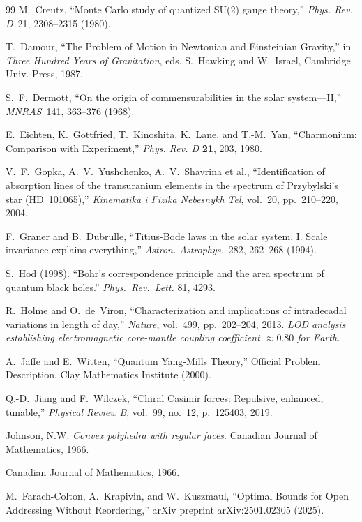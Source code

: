 \documentclass[12pt,oneside]{book}
\begin{document}
\begin{thebibliography}{99}
M.~Creutz,
``Monte Carlo study of quantized SU(2) gauge theory,''
\emph{Phys. Rev. D}\ 21, 2308--2315 (1980).

T.~Damour, ``The Problem of Motion in Newtonian and Einsteinian Gravity,'' in \emph{Three Hundred Years of Gravitation}, eds. S.~Hawking and W.~Israel, Cambridge Univ. Press, 1987.

S.~F.~Dermott, ``On the origin of commensurabilities in the solar system---II,'' \emph{MNRAS}\ 141, 363--376 (1968).

E.~Eichten, K.~Gottfried, T.~Kinoshita, K.~Lane, and T.-M.~Yan, ``Charmonium: Comparison with Experiment,'' \emph{Phys. Rev. D} \textbf{21}, 203, 1980.

V.~F.~Gopka, A.~V.~Yushchenko, A.~V.~Shavrina et al.,
``Identification of absorption lines of the transuranium elements in the spectrum of Przybylski's star (HD~101065),''
\emph{Kinematika i Fizika Nebesnykh Tel}, vol.~20, pp.~210--220, 2004.

F.~Graner and B.~Dubrulle, ``Titius-Bode laws in the solar system. I. Scale invariance explains everything,'' \emph{Astron. Astrophys.}\ 282, 262--268 (1994).

S.~Hod (1998).
``Bohr's correspondence principle and the area spectrum of quantum black holes.''
\textit{Phys.\ Rev.\ Lett.} 81, 4293.

R.~Holme and O.~de~Viron,
``Characterization and implications of intradecadal variations in length of day,''
\emph{Nature}, vol.~499, pp.~202--204, 2013.
\textit{LOD analysis establishing electromagnetic core-mantle coupling coefficient
$\approx 0.80$ for Earth.}

A.~Jaffe and E.~Witten,
``Quantum Yang-Mills Theory,''
Official Problem Description, Clay Mathematics Institute (2000).

Q.-D.~Jiang and F.~Wilczek,
``Chiral Casimir forces: Repulsive, enhanced, tunable,''
\emph{Physical Review B}, vol.~99, no.~12, p.~125403, 2019.

Johnson, N.W.
\newblock \emph{Convex polyhedra with regular faces}.
\newblock Canadian Journal of Mathematics, 1966.

\newblock Canadian Journal of Mathematics, 1966.

M.~Farach-Colton, A.~Krapivin, and W.~Kuszmaul,
``Optimal Bounds for Open Addressing Without Reordering,''
arXiv preprint arXiv:2501.02305 (2025).


\end{thebibliography}
\end{document}

